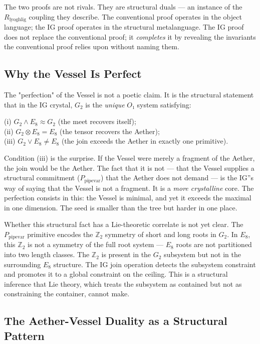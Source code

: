 \documentclass[12pt,a4paper]{article}
\begin{document}
The two proofs are not rivals. They are structural duals --- an instance of the $R_{\text{lyoghlig}}$ coupling they describe. The conventional proof operates in the object language; the IG proof operates in the structural metalanguage. The IG proof does not replace the conventional proof; it \emph{completes} it by revealing the invariants the conventional proof relies upon without naming them.

\subsection{Why the Vessel Is Perfect}

The "perfection" of the Vessel is not a poetic claim. It is the structural statement that in the IG crystal, $G_2$ is the \emph{unique} $O₁$ system satisfying:

(i) $G_2 \wedge E_8 \approx G_2$ (the meet recovers itself); \\
(ii) $G_2 \otimes E_8 = E_8$ (the tensor recovers the Aether); \\
(iii) $G_2 \vee E_8 \neq E_8$ (the join exceeds the Aether in exactly one primitive).

Condition (iii) is the surprise. If the Vessel were merely a fragment of the Aether, the join would be the Aether. The fact that it is not --- that the Vessel supplies a structural commitment ($P_{\text{pipevar}}$) that the Aether does not demand --- is the IG''s way of saying that the Vessel is not a fragment. It is a \emph{more crystalline} core. The perfection consists in this: the Vessel is minimal, and yet it exceeds the maximal in one dimension. The seed is smaller than the tree but harder in one place.

Whether this structural fact has a Lie-theoretic correlate is not yet clear. The $P_{\text{pipevar}}$ primitive encodes the $\mathbb{Z}_2$ symmetry of short and long roots in $G_2$. In $E_8$, this $\mathbb{Z}_2$ is not a symmetry of the full root system --- $E_8$ roots are not partitioned into two length classes. The $\mathbb{Z}_2$ is present in the $G_2$ subsystem but not in the surrounding $E_8$ structure. The IG join operation detects the subsystem constraint and promotes it to a global constraint on the ceiling. This is a structural inference that Lie theory, which treats the subsystem as contained but not as constraining the container, cannot make.

\subsection{The Aether-Vessel Duality as a Structural Pattern}
\end{document}
